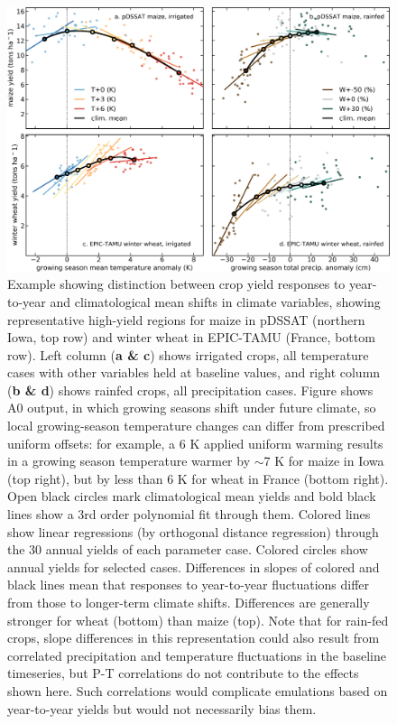 \documentclass[gmd, manuscript]{copernicus} %
\begin{document}
\begin{figure}[ht]
\centering
   \includegraphics[width=15cm]{figures/phase_II_em_figure_1.png}
   \caption{
   Example showing distinction between crop yield responses to year-to-year and climatological mean shifts in climate variables, showing representative high-yield regions for maize in pDSSAT (northern Iowa, top row) and winter wheat in EPIC-TAMU (France, bottom row).
   Left column (\textbf{a \& c}) shows irrigated crops, all temperature cases
   with other variables held at baseline values, and right column (\textbf{b \& d}) shows rainfed crops, all precipitation cases.
   Figure shows A0 output, in which growing seasons shift under future climate, so local growing-season temperature changes can differ from prescribed uniform offsets: for example, a 6 K applied uniform warming results in a growing season temperature warmer by $\sim$7 K for maize in Iowa (top right), but by less than 6 K for wheat in France (bottom right). 
   Open black circles mark climatological mean yields and bold black lines show a 3rd order polynomial fit through them. 
   Colored lines show linear regressions (by orthogonal distance regression) through the 30 annual yields of each parameter case.
   Colored circles show annual yields for selected cases.
   Differences in slopes of colored and black lines mean that responses to year-to-year fluctuations differ from those to longer-term climate shifts. Differences are generally stronger for wheat (bottom) than maize (top).
   Note that for rain-fed crops, slope differences in this representation could also result from correlated precipitation and temperature fluctuations in the baseline timeseries, but P-T correlations do not contribute to the effects shown here. 
   Such correlations would complicate emulations based on year-to-year yields but would not necessarily bias them.
   }
   \label{fig:yearvclim}
\end{figure}
\end{document}

